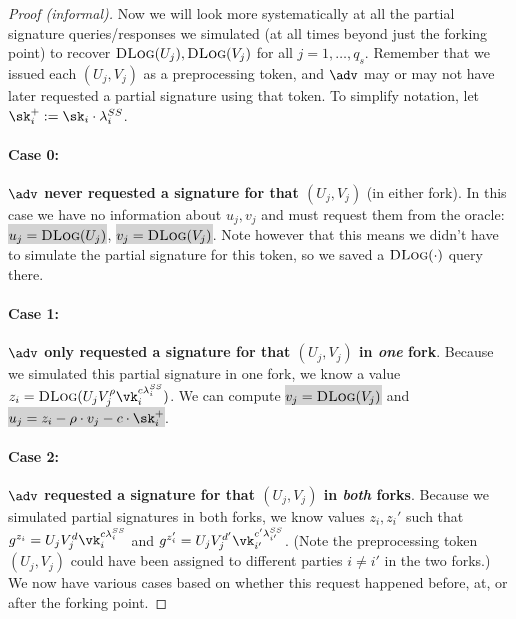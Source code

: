 \begin{proof}[Proof (informal)]
Now we will look more systematically at all the partial signature queries/responses we simulated (at all times beyond just the forking point) to recover $\textsc{DLog}(U_j), \textsc{DLog}(V_j)$ for all $j = 1, \dots, q_s$. Remember that we issued each $(U_j, V_j)$ as a preprocessing token, and $\adv$ may or may not have later requested a partial signature using that token. To simplify notation, let $\sk_i^+ := \sk_i \cdot \lambda_i^{SS}$.

\paragraph{Case 0:} \textbf{$\adv$ never requested a signature for that $(U_j, V_j)$} (in either fork).
In this case we have no information about $u_j, v_j$ and must request them from the oracle: \colorbox{lightgray}{$u_j = \textsc{DLog}(U_j)$}, \colorbox{lightgray}{$v_j = \textsc{DLog}(V_j)$}. Note however that this means we didn't have to simulate the partial signature for this token, so we saved a $\textsc{DLog}(\cdot)$ query there.

\paragraph{Case 1:} \textbf{$\adv$ only requested a signature for that $(U_j, V_j)$ in \emph{one} fork}.
Because we simulated this partial signature in one fork, we know a value $z_i = \textsc{DLog}(U_j V_j^\rho \vk_i^{c \lambda_i^{SS}})$. We can compute \colorbox{lightgray}{$v_j = \textsc{DLog}(V_j)$} and \colorbox{lightgray}{$u_j = z_i - \rho \cdot v_j - c \cdot \sk_i^+$}.

\paragraph{Case 2:} \textbf{$\adv$ requested a signature for that $(U_j, V_j)$ in \emph{both} forks}.
Because we simulated partial signatures in both forks, we know values $z_i, z_i'$ such that $g^{z_i} = U_j V_j^d \vk_i^{c \lambda_i^{SS}}$ and $g^{z_i'} = U_j V_j^{d'} \vk_{i'}^{c' \lambda_{i'}^{SS}}$. (Note the preprocessing token $(U_j, V_j)$ could have been assigned to different parties $i \neq i'$ in the two forks.)
We now have various cases based on whether this request happened before, at, or after the forking point.


\end{proof}
